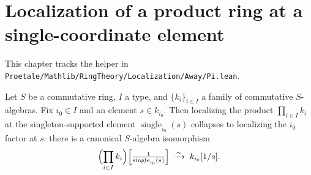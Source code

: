 \chapter{Localization of a product ring at a single-coordinate element}
\label{chap:Mathlib_RingTheory_Localization_Away_Pi}

This chapter tracks the helper
in \texttt{Proetale/Mathlib/RingTheory/Localization/Away/Pi.lean}.

\begin{theorem}
  \label{thm:localization-away-pi-single-equiv}
  \leanok
  Let $S$ be a commutative ring, $I$ a type, and $\{k_i\}_{i \in I}$ a
  family of commutative $S$-algebras. Fix $i_0 \in I$ and an element
  $s \in k_{i_0}$. Then localizing the product $\prod_{i \in I} k_i$ at
  the singleton-supported element $\operatorname{single}_{i_0}(s)$
  collapses to localizing the $i_0$ factor at $s$: there is a canonical
  $S$-algebra isomorphism
  \[
    \Bigl(\prod_{i \in I} k_i\Bigr)\!\left[\tfrac{1}{\operatorname{single}_{i_0}(s)}\right]
    \;\xrightarrow{\sim}\; k_{i_0}[1/s].
  \]
\end{theorem}
